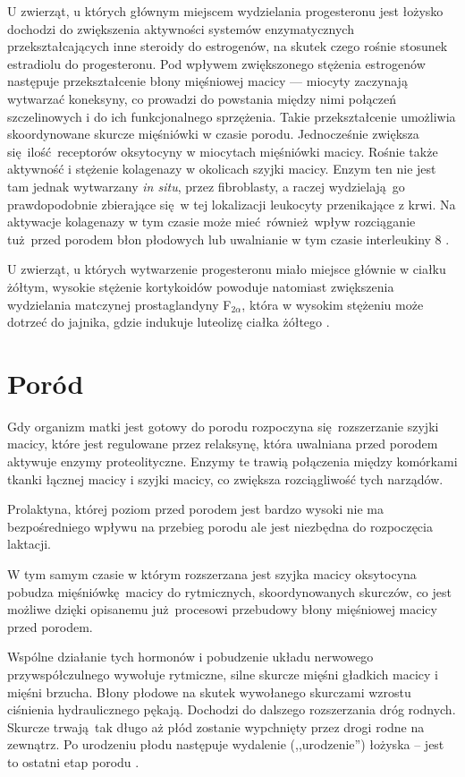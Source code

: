 \documentclass[two column, twoside, a4paper]{article}
\begin{document}
U zwierząt, u których głównym miejscem wydzielania progesteronu jest łożysko dochodzi do zwiększenia aktywności systemów enzymatycznych przekształcających inne steroidy do estrogenów, na skutek czego rośnie stosunek estradiolu do progesteronu. Pod wpływem zwiększonego stężenia estrogenów następuje przekształcenie błony mięśniowej macicy --- miocyty zaczynają wytwarzać koneksyny, co prowadzi do powstania między nimi połączeń szczelinowych i do ich funkcjonalnego sprzężenia. Takie przekształcenie umożliwia skoordynowane skurcze mięśniówki w czasie porodu. Jednocześnie zwiększa się ilość receptorów oksytocyny w miocytach mięśniówki macicy. Rośnie także aktywność i stężenie kolagenazy w okolicach szyjki macicy. Enzym ten nie jest tam jednak wytwarzany \textit{in situ}, przez fibroblasty, a raczej wydzielają go prawdopodobnie zbierające się w tej lokalizacji leukocyty przenikające z krwi. Na aktywacje kolagenazy w tym czasie może mieć również wpływ rozciąganie tuż przed porodem błon płodowych lub uwalnianie w tym czasie interleukiny 8 \autocite{Krzymowski2005, Mitchell1993, Osmers1992, Rajabi1988, El1996}.

U zwierząt, u których wytwarzenie progesteronu miało miejsce głównie w ciałku żółtym, wysokie stężenie kortykoidów powoduje natomiast zwiększenia wydzielania matczynej prostaglandyny F$_{2\alpha}$, która w wysokim stężeniu może dotrzeć do jajnika, gdzie indukuje luteolizę ciałka żółtego \autocite{Krzymowski2005, Watanabe1994}.

\section{Poród}

Gdy organizm matki jest gotowy do porodu rozpoczyna się rozszerzanie szyjki macicy, które jest regulowane przez relaksynę, która uwalniana przed porodem aktywuje enzymy proteolityczne. Enzymy te trawią połączenia między komórkami tkanki łącznej macicy i szyjki macicy, co zwiększa rozciągliwość tych narządów.

Prolaktyna, której poziom przed porodem jest bardzo wysoki nie ma bezpośredniego wpływu na przebieg porodu ale jest niezbędna do rozpoczęcia laktacji.

W tym samym czasie w którym rozszerzana jest szyjka macicy oksytocyna pobudza mięśniówkę macicy do rytmicznych, skoordynowanych skurczów, co jest możliwe dzięki opisanemu już procesowi przebudowy błony mięśniowej macicy przed porodem.

Wspólne działanie tych hormonów i pobudzenie układu nerwowego przywspółczulnego wywołuje rytmiczne, silne skurcze mięśni gładkich macicy i mięśni brzucha. Błony płodowe na skutek wywołanego skurczami wzrostu ciśnienia hydraulicznego pękają. Dochodzi do dalszego rozszerzania dróg rodnych. Skurcze trwają tak długo aż płód zostanie wypchnięty przez drogi rodne na zewnątrz. Po urodzeniu płodu następuje wydalenie (,,urodzenie'') łożyska -- jest to ostatni etap porodu \autocite{Krzymowski2005}.
\end{document}

